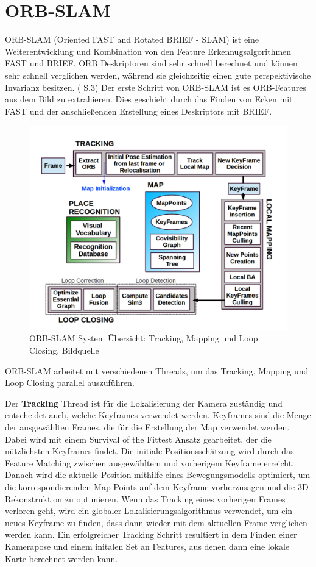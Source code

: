 \section{ORB-SLAM}

ORB-SLAM (Oriented FAST and Rotated BRIEF - SLAM) ist eine Weiterentwicklung und Kombination von den Feature Erkennugsalgorithmen FAST und BRIEF. ORB Deskriptoren sind sehr schnell berechnet und können sehr schnell verglichen werden, während sie gleichzeitig einen gute perspektivische Invarianz besitzen. (\cite{orbslam_og} S.3) Der erste Schritt von ORB-SLAM ist es ORB-Features aus dem Bild zu extrahieren. Dies geschieht durch das Finden von Ecken mit FAST und der anschließenden Erstellung eines Deskriptors mit BRIEF.

\begin{figure}[H]
	\centering
	\includegraphics[scale=0.5]{orb.png}
	\caption{ORB-SLAM System Übersicht: Tracking, Mapping und Loop Closing. Bildquelle \cite{orbslam_og}}
\end{figure} 

ORB-SLAM arbeitet mit verschiedenen Threads, um das Tracking, Mapping und Loop Closing parallel auszuführen. 

Der \textbf{Tracking} Thread ist für die Lokalisierung der Kamera zuständig und entscheidet auch, welche Keyframes verwendet werden. Keyframes sind die Menge der ausgewählten Frames, die für die Erstellung der Map verwendet werden. Dabei wird mit einem \glqq Survival of the Fittest\grqq{} Ansatz gearbeitet, der die nützlichsten Keyframes findet. Die initiale Positionsschätzung wird durch das Feature Matching zwischen ausgewähltem und vorherigem Keyframe erreicht. Danach wird die aktuelle Position mithilfe eines Bewegungsmodells optimiert, um die korrespondierenden Map Points auf dem Keyframe vorherzusagen und die 3D-Rekonstruktion zu optimieren. Wenn das Tracking eines vorherigen Frames verloren geht, wird ein globaler Lokalisierungsalgorithmus verwendet, um ein neues Keyframe zu finden, dass dann wieder mit dem aktuellen Frame verglichen werden kann. Ein erfolgreicher Tracking Schritt resultiert in dem Finden einer Kamerapose und einem initalen Set an Features, aus denen dann eine lokale Karte berechnet werden kann. 

